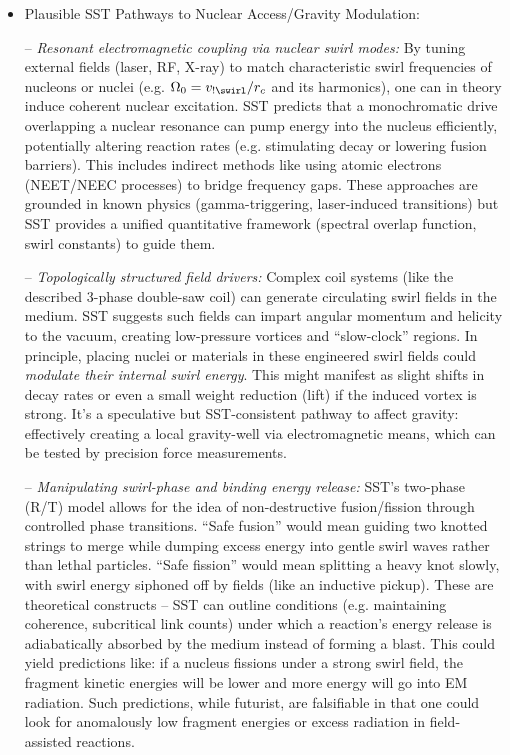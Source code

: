 \documentclass[11pt]{article}
\begin{document}
\begin{itemize}

\item 
Plausible SST Pathways to Nuclear Access/Gravity Modulation:

– \textit{Resonant electromagnetic coupling via nuclear swirl modes:} By tuning external fields (laser, RF, X-ray) to match characteristic swirl frequencies of nucleons or nuclei (e.g. $\Omega_0 = v_{!\swirl}/r_c$ and its harmonics), one can in theory induce coherent nuclear excitation. SST predicts that a monochromatic drive overlapping a nuclear resonance can pump energy into the nucleus efficiently, potentially altering reaction rates (e.g. stimulating decay or lowering fusion barriers). This includes indirect methods like using atomic electrons (NEET/NEEC processes) to bridge frequency gaps. These approaches are grounded in known physics (gamma-triggering, laser-induced transitions) but SST provides a unified quantitative framework (spectral overlap function, swirl constants) to guide them.

– \textit{Topologically structured field drivers:} Complex coil systems (like the described 3-phase double-saw coil) can generate circulating swirl fields in the medium. SST suggests such fields can impart angular momentum and helicity to the vacuum, creating low-pressure vortices and “slow-clock” regions. In principle, placing nuclei or materials in these engineered swirl fields could \textit{modulate their internal swirl energy}. This might manifest as slight shifts in decay rates or even a small weight reduction (lift) if the induced vortex is strong. It’s a speculative but SST-consistent pathway to affect gravity: effectively creating a local gravity-well via electromagnetic means, which can be tested by precision force measurements.

– \textit{Manipulating swirl-phase and binding energy release:} SST’s two-phase (R/T) model allows for the idea of non-destructive fusion/fission through controlled phase transitions. “Safe fusion” would mean guiding two knotted strings to merge while dumping excess energy into gentle swirl waves rather than lethal particles. “Safe fission” would mean splitting a heavy knot slowly, with swirl energy siphoned off by fields (like an inductive pickup). These are theoretical constructs – SST can outline conditions (e.g. maintaining coherence, subcritical link counts) under which a reaction’s energy release is adiabatically absorbed by the medium instead of forming a blast. This could yield predictions like: if a nucleus fissions under a strong swirl field, the fragment kinetic energies will be lower and more energy will go into EM radiation. Such predictions, while futurist, are falsifiable in that one could look for anomalously low fragment energies or excess radiation in field-assisted reactions.





\end{itemize}
\end{document}
